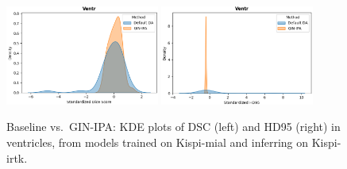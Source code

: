\begin{figure}[htbp]
  \centering
  \includegraphics[width=0.45\textwidth]{figures/1_mial-irtk_DC_Ventr.png}\quad
  \includegraphics[width=0.45\textwidth]{figures/1_mial-irtk_HD_Ventr.png}
  \caption{Baseline vs.\ GIN-IPA: KDE plots of DSC (left) and HD95 (right) in ventricles, from models trained on Kispi-mial and inferring on Kispi-irtk.}
  \label{fig:1_mial_irtk_ventr}
\end{figure}

